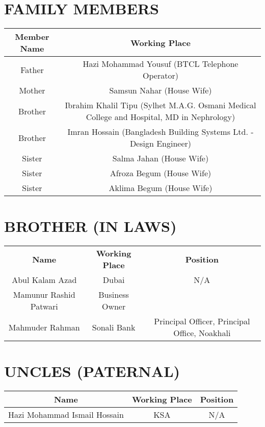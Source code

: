 \documentclass{article}
\begin{document}
\section*{FAMILY MEMBERS}
{\small
\begin{tabular}{|c|c|}
    \hline
    \textbf{Member Name} & \textbf{Working Place} \\
    \hline
    Father & Hazi Mohammad Yousuf (BTCL Telephone Operator) \\
    \hline
    Mother & Samsun Nahar (House Wife) \\
    \hline
    Brother & Ibrahim Khalil Tipu (Sylhet M.A.G. Osmani Medical College and Hospital, MD in Nephrology) \\
    \hline
    Brother & Imran Hossain (Bangladesh Building Systems Ltd. - Design Engineer) \\
    \hline
    Sister & Salma Jahan (House Wife) \\
    \hline
    Sister & Afroza Begum (House Wife) \\
    \hline
    Sister & Aklima Begum (House Wife) \\
    \hline
\end{tabular}
}

\section*{BROTHER (IN LAWS)}
\begin{tabular}{|c|c|c|}
    \hline
    \textbf{Name} & \textbf{Working Place} & \textbf{Position} \\
    Abul Kalam Azad & Dubai & N/A \\
    \hline
    Mamunur Rashid Patwari & Business Owner \\
    \hline
    Mahmuder Rahman & Sonali Bank & Principal Officer, Principal Office, Noakhali \\
    \hline
\end{tabular}

\section*{UNCLES (PATERNAL)}
\begin{tabular}{|c|c|c|}
    \hline
    \textbf{Name} & \textbf{Working Place} & \textbf{Position} \\
    \hline
    Hazi Mohammad Ismail Hossain & KSA & N/A \\
    \hline
\end{tabular}
\end{document}
